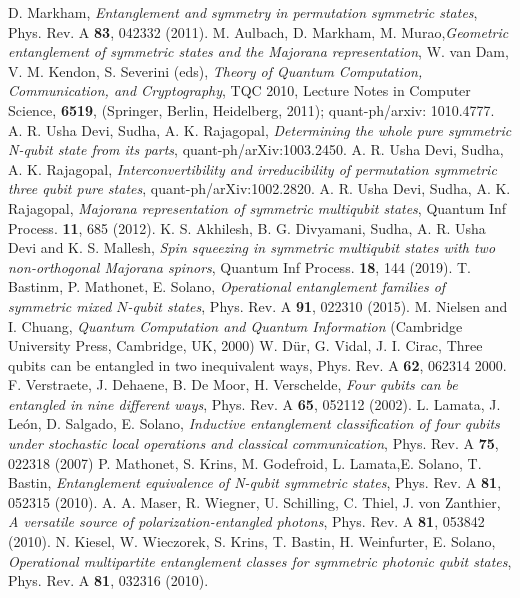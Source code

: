 {\begin{thebibliography}{0}
 D. Markham, {\em Entanglement and symmetry in permutation symmetric states}, Phys. Rev. A 
{\bf 83}, 042332 (2011).
 M. Aulbach,  D. Markham, M. Murao,{\em Geometric entanglement of symmetric states and the Majorana representation}, W. van Dam, V. M. Kendon, S. Severini (eds), {\em Theory of Quantum Computation, Communication, and Cryptography}, TQC 2010, Lecture Notes in Computer Science, {\bf 6519}, (Springer, Berlin, Heidelberg, 2011); quant-ph/arxiv: 1010.4777.
 A. R. Usha Devi,  Sudha, A. K. Rajagopal, {\em Determining the whole pure symmetric N-qubit state from its parts},  quant-ph/arXiv:1003.2450.
 A. R. Usha Devi,  Sudha, A. K. Rajagopal, {\em Interconvertibility and irreducibility of permutation symmetric three qubit pure states},
quant-ph/arXiv:1002.2820. 
 A. R. Usha Devi,  Sudha, A. K. Rajagopal, {\em  Majorana representation of symmetric multiqubit states}, Quantum Inf Process. {\bf 11}, 685 (2012).
 K. S. Akhilesh, B. G. Divyamani, Sudha, A. R. Usha Devi and K. S. Mallesh, {\em Spin squeezing in symmetric multiqubit states with two non-orthogonal Majorana spinors}, Quantum Inf Process. {\bf 18}, 144 (2019).  
 T. Bastinm, P. Mathonet, E. Solano, {\em Operational entanglement families of symmetric mixed $N$-qubit states}, Phys. Rev. A {\bf 91}, 022310 (2015).   
 M. Nielsen and I. Chuang, {\em Quantum Computation
	and Quantum Information} (Cambridge University Press,
Cambridge, UK, 2000)
 W. D{\"u}r,  G. Vidal, J. I. Cirac, {Three qubits can be entangled in two inequivalent ways}, Phys. Rev. A {\bf 62}, 062314 2000.
 F. Verstraete, J.  Dehaene, B. De Moor, H. Verschelde, {\em Four qubits can be entangled in nine different ways}, Phys. Rev. A  {\bf 65}, 052112  (2002).
 L. Lamata, J. Le{\'o}n, D. Salgado, E. Solano, {\em Inductive entanglement classification of four qubits under stochastic local operations
	and classical communication}, Phys. Rev. A {\bf 75}, 022318 (2007)
 P. Mathonet, S. Krins, M. Godefroid, L. Lamata,E. Solano,  T. Bastin, {\em Entanglement equivalence of N-qubit symmetric states},  Phys. Rev. A {\bf 81}, 052315  (2010).
  A. A. Maser, R. Wiegner, U. Schilling, C. Thiel, J. von Zanthier, {\em A versatile source of polarization-entangled photons},  Phys. Rev. A {\bf 81}, 
053842 (2010).
 N. Kiesel, W. Wieczorek,  S. Krins,  T. Bastin,  H. Weinfurter,  E. Solano, {\em Operational multipartite entanglement classes for symmetric photonic qubit states}, Phys. Rev. A {\bf 81}, 032316 (2010).

\end{thebibliography}}
